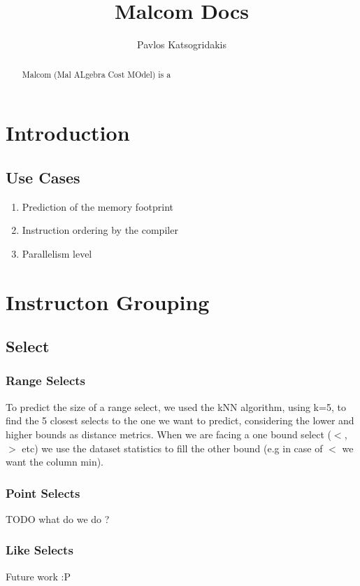\documentclass{article}
\begin{document}
\author{Pavlos Katsogridakis}
\title{Malcom Docs}

\maketitle

\begin{abstract}
Malcom (Mal ALgebra Cost MOdel) is a
\end{abstract}

\section{Introduction}
\subsection{Use Cases}
\begin{enumerate}
  \item Prediction of the memory footprint
  \item Instruction ordering by the compiler
  \item Parallelism level
\end{enumerate}

\section{Instructon Grouping}

\subsection{Select}
\subsubsection{Range Selects}
To predict the size of a range select, we used the kNN algorithm,
using k=5, to find the 5 closest selects to the one we want to predict,
considering the lower and higher bounds as distance metrics.
When we are facing a one bound select ($<$,$>$ etc) we use the
dataset statistics to fill the other bound (e.g in case of $<$ we want the column min).
\subsubsection{Point Selects}
TODO what do we do ?

\subsubsection{Like Selects}
Future work :P
\end{document}
